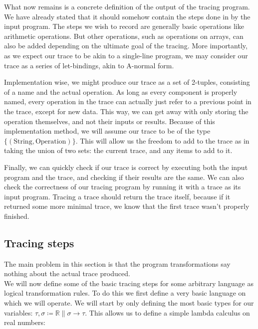     What now remains is a concrete definition of the output of the tracing program.
    We have already stated that it should somehow contain the steps done in by the input program.
    The steps we wish to record are generally basic operations like arithmetic operations.
    But other operations, such as operations on arrays, can also be added depending on the ultimate goal of the tracing.
    More importantly, as we expect our trace to be akin to a single-line program, we may consider our trace as a series of let-bindings, akin to A-normal form\cn.
    
    Implementation wise, we might produce our trace as a set of 2-tuples, consisting of a name and the actual operation.
    As long as every component is properly named, every operation in the trace can actually just refer to a previous point in the trace, except for new data.
    This way, we can get away with only storing the operation themselves, and not their inputs or results.
    Because of this implementation method, we will assume our trace to be of the type $\{(\text{String},\text{Operation})\}$.
    This will allow us the freedom to add to the trace as in taking the union of two sets: the current trace, and any items to add to it.
    
    Finally, we can quickly check if our trace is correct by executing both the input program and the trace, and checking if their results are the same.
    We can also check the correctness of our tracing program by running it with a trace as its input program.
    Tracing a trace should return the trace itself, because if it returned some more minimal trace, we know that the first trace wasn't properly finished.

    \subsection{Tracing steps} \label{sec:lambda}
        {\color{red}The main problem in this section is that the program transformations say nothing about the actual trace produced.}\\
        We will now define some of the basic tracing steps for some arbitrary language as logical transformation rules.
        To do this we first define a very basic language on which we will operate.
        We will start by only defining the most basic types for our variables: $\tau,\sigma\coloneqq\mathbb{R}\|\sigma\to\tau$.
        This allows us to define a simple lambda calculus on real numbers:


